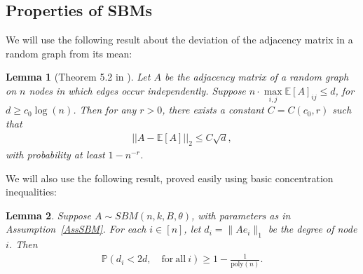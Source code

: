 \documentclass{article}
\newtheorem{lemma}{Lemma}
\newcommand{\mprob}{\mathbb{P}}
\begin{document}

\subsection{Properties of SBMs}
\label{AppDegree}

We will use the following result about the deviation of the adjacency matrix in a random graph from its mean:

\begin{lemma}[Theorem 5.2 in \cite{LeiRin15}]
\label{lemma:thm5.2LeiRin}
Let $A$ be the adjacency matrix of a random graph on $n$ nodes in which edges occur independently. Suppose $n \cdot \max\limits_{i, j}\mathbb{E}[A]_{ij} \leq d$, for $d \geq c_0\log(n)$. Then for any $r > 0$, there exists a constant $C = C(c_0, r)$ such that
\begin{align*}
||A - \mathbb{E}[A]||_2 \leq C\sqrt{d},
\end{align*}
with probability at least $1 - n^{-r}$.
\end{lemma}

We will also use the following result, proved easily using basic concentration inequalities:

\begin{lemma}
\label{lemma:hp_removal_d}
Suppose $A \sim SBM(n, k, B, \theta)$, with parameters as in Assumption~\ref{AssSBM}.
For each $i \in [n]$, let $d_i = \|Ae_i\|_1$ be the degree of node $i$. Then
\begin{align*}
\mprob\left(d_i < 2d, \quad \mathrm{for \ all} \  i\right) \ge 1 - \frac{1}{\mathrm{poly}(n)}.
\end{align*}
\end{lemma}
\end{document}
